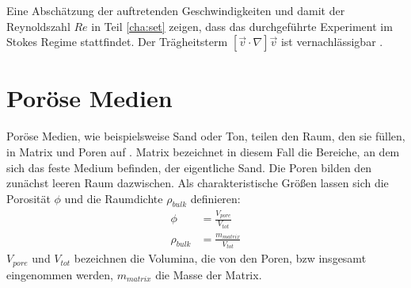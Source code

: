 Eine Abschätzung der auftretenden Geschwindigkeiten und damit der Reynoldszahl $Re$ in Teil \ref{cha:set} zeigen, dass das durchgeführte Experiment im Stokes Regime stattfindet. Der Trägheitsterm $\left[ \vec{v} \cdot \nabla \right] \vec{v}$  ist vernachlässigbar \citep{roth2005}.






\section{Poröse Medien}
\label{sec:por}

Poröse Medien, wie beispielsweise Sand oder Ton, teilen den Raum, den sie füllen, in Matrix und Poren auf \citep{roth2005}.  Matrix bezeichnet in diesem Fall die Bereiche, an dem sich das feste Medium befinden, der eigentliche Sand. Die Poren bilden den zunächst leeren Raum dazwischen.
Als charakteristische Größen lassen sich die Porosität $\phi$ und die Raumdichte $\rho_{bulk}$ definieren:
\begin{align}
 \phi &= \frac{V_{pore}}{V_{tot}} \\
 \rho_{bulk} &= \frac{m_{matrix}}{V_{tot}} %
\end{align}
$V_{pore}$ und $V_{tot}$ bezeichnen die Volumina, die von den Poren, bzw insgesamt eingenommen werden, $m_{matrix}$ die Masse der Matrix. 

